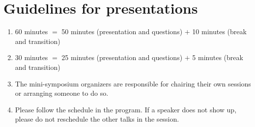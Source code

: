 \documentclass[a4paper]{article}
\begin{document}
\section*{Guidelines for presentations}
\begin{enumerate}
\item 60 minutes $=$ 50 minutes (presentation and questions) $+$ 10 minutes (break and transition)
\item 30 minutes $=$ 25 minutes (presentation and questions) $+$ 5 minutes (break and transition)
\item The mini-symposium organizers are responsible for chairing their own sessions or arranging someone to do so.
\item Please follow the schedule in the program.  If a speaker does not show up, please do not reschedule the other talks in the session.
\end{enumerate}

\newpage

\tableofcontents

\newpage







\end{document}
